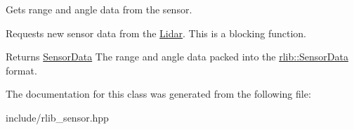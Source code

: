 Gets range and angle data from the sensor. 

Requests new sensor data from the \hyperlink{classrlib_1_1Lidar}{Lidar}. This is a blocking function. \begin{DoxyReturn}{Returns}
\hyperlink{classrlib_1_1SensorData}{Sensor\-Data} The range and angle data packed into the \hyperlink{classrlib_1_1SensorData}{rlib\-::\-Sensor\-Data} format. 
\end{DoxyReturn}


The documentation for this class was generated from the following file\-:\begin{DoxyCompactItemize}
\item 
include/rlib\-\_\-sensor.\-hpp\end{DoxyCompactItemize}
